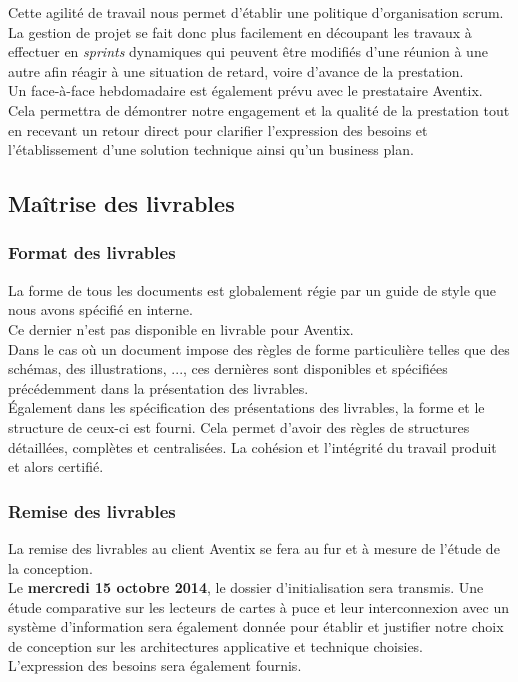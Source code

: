 Cette agilité de travail nous permet d'établir une politique d'organisation
scrum. La gestion de projet se fait donc plus facilement en découpant les
travaux à effectuer en \textit{sprints} dynamiques qui peuvent être modifiés
d'une réunion à une autre afin réagir à une situation de retard, voire d'avance
de la prestation. \\

Un face-à-face hebdomadaire est également prévu avec le prestataire Aventix.
Cela permettra de démontrer notre engagement et la qualité de la prestation
tout en recevant un retour direct pour clarifier l'expression des besoins et
l'établissement d'une solution technique ainsi qu'un business plan. \\

\subsection{Maîtrise des livrables}
\subsubsection{Format des livrables}
La forme de tous les documents est globalement régie par un guide de style que
nous avons spécifié en interne. \\
Ce dernier n'est pas disponible en livrable pour Aventix. \\

Dans le cas où un document impose des règles de forme particulière telles que
des schémas, des illustrations, ..., ces dernières sont disponibles et
spécifiées précédemment dans la présentation des livrables. \\

Également dans les spécification des présentations des livrables, la forme et
le structure de ceux-ci est fourni. Cela permet d'avoir des règles de
structures détaillées, complètes et centralisées. La cohésion et l'intégrité du
travail produit et alors certifié. \\

\subsubsection{Remise des livrables}
La remise des livrables au client Aventix se fera au fur et à mesure de l'étude
de la conception. \\

Le \textbf{mercredi 15 octobre 2014}, le dossier d'initialisation sera transmis.
Une étude comparative sur les lecteurs de cartes à puce et leur interconnexion
avec un système d'information sera également donnée pour établir et justifier
notre choix de conception sur les architectures applicative et technique
choisies. \\
L'expression des besoins sera également fournis. \\

